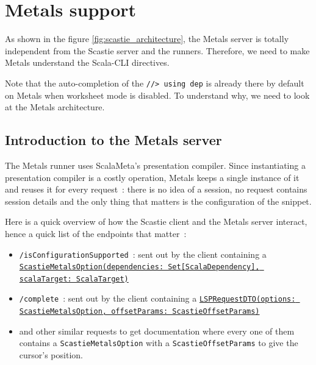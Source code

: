 \documentclass{article}
\begin{document}
\section{Metals support}

As shown in the figure \ref{fig:scastie_architecture}, the Metals server is totally independent from the Scastie server and the runners. Therefore, we need to make Metals understand the Scala-CLI directives.

Note that the auto-completion of the \lstinline{//> using dep} is already there by default on Metals when worksheet mode is disabled. To understand why, we need to look at the Metals architecture.

\subsection{Introduction to the Metals server}

The Metals runner uses ScalaMeta's presentation compiler. Since instantiating a presentation compiler is a costly operation, Metals keeps a single instance of it and reuses it for every request~: there is no idea of a session, no request contains session details and the only thing that matters is the configuration of the snippet.

Here is a quick overview of how the Scastie client and the Metals server interact, hence a quick list of the endpoints that matter~:

\begin{itemize}
    \item \lstinline{/isConfigurationSupported}~: sent out by the client containing a \href{https://github.com/Maeeen/scastie/blob/main/api/src/main/scala/com.olegych.scastie.api/ApiModels.scala#LL132C101-L132C101}{\lstinline{ScastieMetalsOption(dependencies: Set[ScalaDependency], scalaTarget: ScalaTarget)}}
    
    \item \lstinline{/complete}~: sent out by the client containing a \href{https://github.com/Maeeen/scastie/blob/23e0fa998565a37d8ecfa36fa64d1268a9c1d12c/api/src/main/scala/com.olegych.scastie.api/ApiModels.scala#L169}{\lstinline{LSPRequestDTO(options: ScastieMetalsOption, offsetParams: ScastieOffsetParams)}}
    \item and other similar requests to get documentation where every one of them contains a \lstinline{ScastieMetalsOption} with a \lstinline{ScastieOffsetParams} to give the cursor's position.
\end{itemize}
\end{document}
